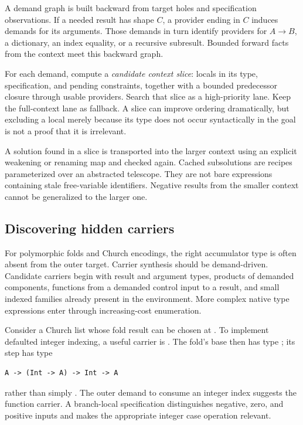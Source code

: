A demand graph is built backward from target holes and specification observations. If a needed result has shape $C$, a provider ending in $C$ induces demands for its arguments. Those demands in turn identify providers for $A\to B$, a dictionary, an index equality, or a recursive subresult. Bounded forward facts from the context meet this backward graph.

For each demand, compute a \emph{candidate context slice}: locals in its type, specification, and pending constraints, together with a bounded predecessor closure through usable providers. Search that slice as a high-priority lane. Keep the full-context lane as fallback. A slice can improve ordering dramatically, but excluding a local merely because its type does not occur syntactically in the goal is not a proof that it is irrelevant.

A solution found in a slice is transported into the larger context using an explicit weakening or renaming map and checked again. Cached subsolutions are recipes parameterized over an abstracted telescope. They are not bare expressions containing stale free-variable identifiers. Negative results from the smaller context cannot be generalized to the larger one.

\subsection{Discovering hidden carriers}

For polymorphic folds and Church encodings, the right accumulator type is often absent from the outer target. Carrier synthesis should be demand-driven. Candidate carriers begin with result and argument types, products of demanded components, functions from a demanded control input to a result, and small indexed families already present in the environment. More complex native type expressions enter through increasing-cost enumeration.

Consider a Church list whose fold result can be chosen at . To implement defaulted integer indexing, a useful carrier is . The fold's base then has type ; its step has type
\par\noindent\begin{minipage}{\linewidth}
\begin{lstlisting}
A -> (Int -> A) -> Int -> A
\end{lstlisting}
\end{minipage}\par
rather than simply . The outer demand to consume an integer index suggests the function carrier. A branch-local specification distinguishes negative, zero, and positive inputs and makes the appropriate integer case operation relevant.

